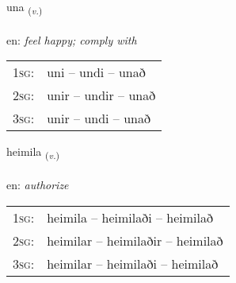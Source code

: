\documentclass[frontgrid, backgrid]{flacards}\usepackage[]{graphicx}\usepackage[]{xcolor}
\begin{document}
\renewcommand{\flhead}{\vskip5pt \fboxsep=0pt {\small\bfseries\footnotesize Sagnorð | Verb}}
\renewcommand{\fcfoot}{\vskip5pt \fboxsep=0pt \hspace{2pt}{\small\bfseries\footnotesize 3K}}

\renewcommand{\blhead}{\vskip5pt {\small\bfseries\footnotesize Sagnorð | Verb }}
\renewcommand{\bcfoot}{\vskip5pt \hspace{2pt}{\small\bfseries\footnotesize 3K}}


{una \small{\textsubscript{(\textit{v.})}} \\[1ex] %
\textphonetic{[ʏːna]} \\
en: \emph{feel happy; comply with} \\  [2ex]
\renewcommand*{\arraystretch}{0.8}
\begin{tabular}{p{1cm}l}
\textsc{1sg}: & uni -- undi -- unað \\ 
\textsc{2sg}: & unir -- undir -- unað \\ 
\textsc{3sg}: & unir -- undi -- unað \\ 
\end{tabular}
}

\renewcommand{\flhead}{\vskip5pt \fboxsep=0pt {\small\bfseries\footnotesize Sagnorð | Verb}}
\renewcommand{\fcfoot}{\vskip5pt \fboxsep=0pt \hspace{2pt}{\small\bfseries\footnotesize 3K}}

\renewcommand{\blhead}{\vskip5pt {\small\bfseries\footnotesize Sagnorð | Verb }}
\renewcommand{\bcfoot}{\vskip5pt \hspace{2pt}{\small\bfseries\footnotesize 3K}}


{heimila \small{\textsubscript{(\textit{v.})}} \\[1ex] %
\textphonetic{[heiːmɪla]} \\
en: \emph{authorize} \\  [2ex]
\renewcommand*{\arraystretch}{0.8}
\begin{tabular}{p{1cm}l}
\textsc{1sg}: & heimila -- heimilaði -- heimilað \\ 
\textsc{2sg}: & heimilar -- heimilaðir -- heimilað \\ 
\textsc{3sg}: & heimilar -- heimilaði -- heimilað \\ 
\end{tabular}
}
\end{document}
